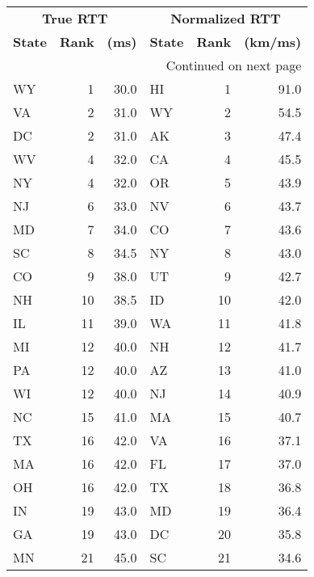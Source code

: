 \begin{longtable}{lrr||lrr}
  \multicolumn{3}{c||}{\textbf{True RTT}} & \multicolumn{3}{c}{\textbf{Normalized RTT}} \\
     \textbf{State} &  \textbf{Rank} & \textbf{(ms)} & \textbf{State} & \textbf{Rank} & \textbf{(km/ms)} \\
\midrule
\endhead
\midrule
\multicolumn{6}{r}{{Continued on next page}} \\
\midrule
\endfoot
\endlastfoot
        WY &    1 &  30.0 &             HI &    1 &  91.0 \\
        VA &    2 &  31.0 &             WY &    2 &  54.5 \\
        DC &    2 &  31.0 &             AK &    3 &  47.4 \\
        WV &    4 &  32.0 &             CA &    4 &  45.5 \\
        NY &    4 &  32.0 &             OR &    5 &  43.9 \\
        NJ &    6 &  33.0 &             NV &    6 &  43.7 \\
        MD &    7 &  34.0 &             CO &    7 &  43.6 \\
        SC &    8 &  34.5 &             NY &    8 &  43.0 \\
        CO &    9 &  38.0 &             UT &    9 &  42.7 \\
        NH &   10 &  38.5 &             ID &   10 &  42.0 \\
        IL &   11 &  39.0 &             WA &   11 &  41.8 \\
        MI &   12 &  40.0 &             NH &   12 &  41.7 \\
        PA &   12 &  40.0 &             AZ &   13 &  41.0 \\
        WI &   12 &  40.0 &             NJ &   14 &  40.9 \\
        NC &   15 &  41.0 &             MA &   15 &  40.7 \\
        TX &   16 &  42.0 &             VA &   16 &  37.1 \\
        MA &   16 &  42.0 &             FL &   17 &  37.0 \\
        OH &   16 &  42.0 &             TX &   18 &  36.8 \\
        IN &   19 &  43.0 &             MD &   19 &  36.4 \\
        GA &   19 &  43.0 &             DC &   20 &  35.8 \\
        MN &   21 &  45.0 &             SC &   21 &  34.6 \\

\end{longtable}
